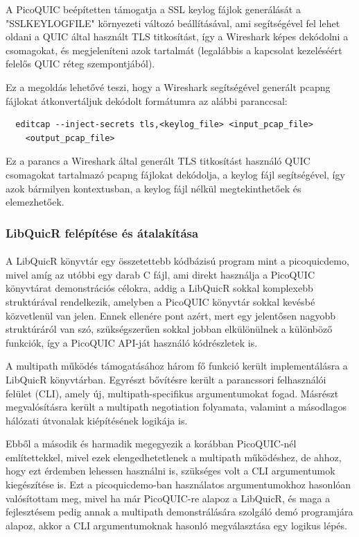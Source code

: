 \documentclass[a4paper,oneside]{article}
\begin{document}
A PicoQUIC beépítetten támogatja a SSL keylog fájlok generálását a "SSLKEYLOGFILE" környezeti változó 
beállításával, ami segítségével fel lehet oldani a QUIC által használt TLS titkosítást,
így a Wireshark képes dekódolni a csomagokat, és megjeleníteni azok 
tartalmát (legalábbis a kapcsolat kezeléséért felelős QUIC réteg szempontjából).

Ez a megoldás lehetővé teszi, hogy a Wireshark segítségével generált 
pcapng fájlokat átkonvertáljuk dekódolt formátumra az alábbi paranccsal:
\begin{verbatim}
  editcap --inject-secrets tls,<keylog_file> <input_pcap_file> 
    <output_pcap_file>
\end{verbatim}
Ez a parancs a Wireshark által generált TLS titkosítást használó QUIC 
csomagokat tartalmazó pcapng fájlokat dekódolja, a keylog fájl segítségével, így azok bármilyen kontextusban, a keylog fájl nélkül megtekinthetőek
és elemezhetőek.


\subsubsection{LibQuicR felépítése és átalakítása}
\paragraph{}

A LibQuicR könyvtár egy összetettebb kódbázisú program mint a picoquicdemo, mivel amíg az utóbbi egy darab C fájl, 
ami direkt használja a PicoQUIC könyvtárat demonstrációs célokra,
addig a LibQuicR sokkal komplexebb struktúrával rendelkezik, amelyben a PicoQUIC könyvtár sokkal kevésbé közvetlenül van jelen.
Ennek ellenére pont azért, mert egy jelentősen nagyobb struktúráról van szó, szükségszerűen sokkal 
jobban elkülönülnek a különböző funkciók, így a PicoQUIC API-ját használó kódrészletek is.

A multipath működés támogatásához három fő funkció került implementálásra a LibQuicR könyvtárban. 
Egyrészt bővítésre került a parancssori felhasználói felület (CLI), amely új, multipath-specifikus 
argumentumokat fogad. Másrészt megvalósításra került a multipath negotiation folyamata, valamint a 
másodlagos hálózati útvonalak kiépítésének logikája is.

Ebből a második és harmadik megegyezik a korábban PicoQUIC-nél említettekkel, mivel ezek elengedhetetlenek a multipath működéshez,
de ahhoz, hogy ezt érdemben lehessen használni is, szükséges volt a CLI argumentumok kiegészítése is.
Ezt a picoquicdemo-ban használatos argumentumokhoz hasonlóan 
valósítottam meg, mivel ha már PicoQUIC-re alapoz a LibQuicR, és maga a fejlesztésem pedig annak a 
multipath demonstrálására szolgáló demó programjára alapoz, akkor a CLI argumentumoknak hasonló megválasztása egy logikus lépés.
\end{document}
